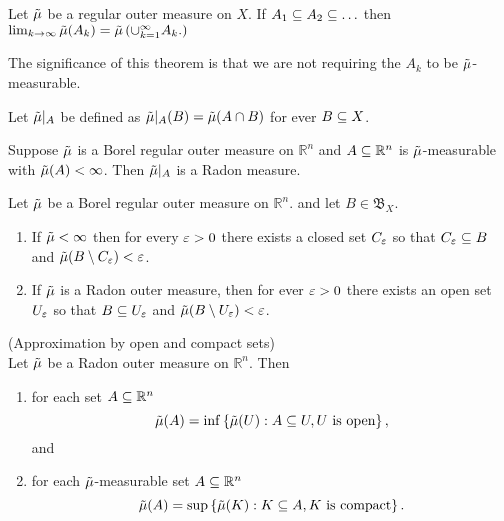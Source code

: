 \begin{thm}\cite[sec 1.1]{evans1991measure}
  Let $\tilde{\mu}$ be a regular outer measure on $X$. If $A_1\subseteq A_2 \subseteq \ldots$
  then $\lim_{k\to \infty}\tilde{\mu}(A_k) = \tilde{\mu}\left( \cup_{k=1}^\infty A_k.
  \right)$
\end{thm}

\begin{remark}
The significance of this theorem is that we are not requiring the $A_k$
to be $\tilde{\mu}$-measurable.
\end{remark}

\begin{defn}
  Let $\tilde{\mu}\rvert_A$ be defined as
  $\tilde{\mu}\rvert_A(B)= \tilde{\mu}(A\cap B)$ for ever $B\subseteq X$.
\end{defn}

\begin{thm}\cite[sec 1.1]{evans1991measure}
  Suppose $\tilde{\mu}$ is a Borel regular outer measure on $\mathbb{R}^n$ and $A\subseteq
  \mathbb{R}^n$ is $\tilde{\mu}$-measurable with $\tilde{\mu}(A)<\infty$. Then
  $\tilde{\mu}\rvert_A$ is a Radon measure.
\end{thm}

\begin{lemma}\cite[sec 1.1]{evans1991measure}
  Let $\tilde{\mu}$ be a Borel regular outer measure on $ \mathbb{R}^n$. and let
  $B\in \mathfrak{B}_X$.
  \begin{enumerate}
    \item If $\tilde{\mu} < \infty$ then for every $\varepsilon>0$ there exists a closed
      set $C_\varepsilon$ so that $C_\varepsilon \subseteq B$ and $\tilde{\mu}(B\setminus C_\varepsilon)<\varepsilon$.
    \item If $\tilde{\mu}$ is a Radon outer measure, then for ever $\varepsilon>0$ there
      exists an open set $U_\varepsilon$ so that $B\subseteq U_\varepsilon$ and
    $\tilde{\mu}(B\setminus U_\varepsilon)< \varepsilon$.
  \end{enumerate}
\end{lemma}

\begin{thm}\cite[sec 1.1]{evans1991measure}(Approximation by open and
  compact sets)\\
  Let $\tilde{\mu}$ be a Radon outer measure on $\mathbb{R}^n$. Then
  \begin{enumerate}
    \item for each set $A\subseteq \mathbb{R}^n$
      \begin{equation*}
        \tilde{\mu}(A) = \inf\left\{ \tilde{\mu}(U):A\subseteq U, U \text{ is open} \right\},
      \end{equation*}
      and
    \item for each $\tilde{\mu}$-measurable set $A\subseteq \mathbb{R}^n$
      \begin{equation*}
        \tilde{\mu}(A) = \sup\left\{ \tilde{\mu}(K):K\subseteq A, K \text{ is compact}
      \right\}.
      \end{equation*}
  \end{enumerate}
\end{thm}

